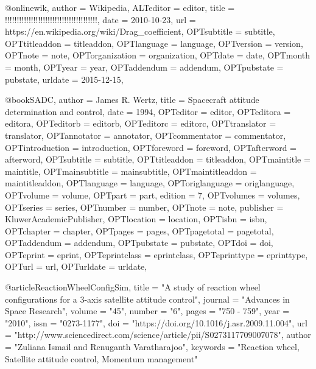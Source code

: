 @online{wik,
	author = {Wikipedia},
	ALTeditor = {editor},
	title = {!!!!!!!!!!!!!!!!!!!!!!!!!!!!!!!!!!!!!!!},
	date = {2010-10-23},
	url = {https://en.wikipedia.org/wiki/Drag_coefficient},
	OPTsubtitle = {subtitle},
	OPTtitleaddon = {titleaddon},
	OPTlanguage = {language},
	OPTversion = {version},
	OPTnote = {note},
	OPTorganization = {organization},
	OPTdate = {date},
	OPTmonth = {month},
	OPTyear = {year},
	OPTaddendum = {addendum},
	OPTpubstate = {pubstate},
	urldate = {2015-12-15},
}

@book{SADC,
	author = {James R. Wertz},
	title = {Spacecraft attitude determination and control},
	date = {1994},
	OPTeditor = {editor},
	OPTeditora = {editora},
	OPTeditorb = {editorb},
	OPTeditorc = {editorc},
	OPTtranslator = {translator},
	OPTannotator = {annotator},
	OPTcommentator = {commentator},
	OPTintroduction = {introduction},
	OPTforeword = {foreword},
	OPTafterword = {afterword},
	OPTsubtitle = {subtitle},
	OPTtitleaddon = {titleaddon},
	OPTmaintitle = {maintitle},
	OPTmainsubtitle = {mainsubtitle},
	OPTmaintitleaddon = {maintitleaddon},
	OPTlanguage = {language},
	OPToriglanguage = {origlanguage},
	OPTvolume = {volume},
	OPTpart = {part},
	edition = {7},
	OPTvolumes = {volumes},
	OPTseries = {series},
	OPTnumber = {number},
	OPTnote = {note},
	publisher = {KluwerAcademicPublisher},
	OPTlocation = {location},
	OPTisbn = {isbn},
	OPTchapter = {chapter},
	OPTpages = {pages},
	OPTpagetotal = {pagetotal},
	OPTaddendum = {addendum},
	OPTpubstate = {pubstate},
	OPTdoi = {doi},
	OPTeprint = {eprint},
	OPTeprintclass = {eprintclass},
	OPTeprinttype = {eprinttype},
	OPTurl = {url},
	OPTurldate = {urldate},
}

@article{ReactionWheelConfigSim,
	title = "A study of reaction wheel configurations for a 3-axis satellite attitude control",
	journal = "Advances in Space Research",
	volume = "45",
	number = "6",
	pages = "750 - 759",
	year = "2010",
	issn = "0273-1177",
	doi = "https://doi.org/10.1016/j.asr.2009.11.004",
	url = "http://www.sciencedirect.com/science/article/pii/S0273117709007078",
	author = "Zuliana Ismail and Renuganth Varatharajoo",
	keywords = "Reaction wheel, Satellite attitude control, Momentum management"
}